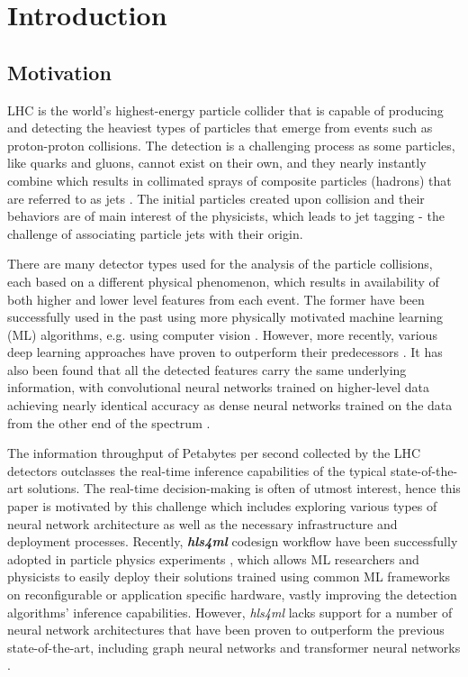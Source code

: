 \chapter{Introduction}\label{introduction}

\section{Motivation}\label{motivation}
LHC is the world's highest-energy particle collider that is capable of producing and detecting the heaviest types of particles that emerge from events such as proton-proton collisions. The detection is a challenging process as some particles, like quarks and gluons, cannot exist on their own, and they nearly instantly combine which results in collimated sprays of composite particles (hadrons) that are referred to as jets \cite{4-cernjets}. The initial particles created upon collision and their behaviors are of main interest of the physicists, which leads to jet tagging - the challenge of associating particle jets with their origin.

There are many detector types used for the analysis of the particle collisions, each based on a different physical phenomenon, which results in availability of both higher and lower level features from each event. The former have been successfully used in the past using more physically motivated machine learning (ML) algorithms, e.g. using computer vision \cite{5-cogan2015jet-images:}. However, more recently, various deep learning approaches have proven to outperform their predecessors \cite{6-de2016jet-images}. It has also been found that all the detected features carry the same underlying information, with convolutional neural networks trained on higher-level data achieving nearly identical accuracy as dense neural networks trained on the data from the other end of the spectrum \cite{7-moore2019reports}.

The information throughput of Petabytes per second collected by the LHC detectors outclasses the real-time inference capabilities of the typical state-of-the-art solutions. The real-time decision-making is often of utmost interest, hence this paper is motivated by this challenge which includes exploring various types of neural network architecture as well as the necessary infrastructure and deployment processes. Recently, \textit{\textbf{hls4ml}} codesign workflow have been successfully adopted in particle physics experiments \cite{8-fahim2021hls4ml:}, which allows ML researchers and physicists to easily deploy their solutions trained using common ML frameworks on reconfigurable or application specific hardware, vastly improving the detection algorithms' inference capabilities. However, \textit{hls4ml} lacks support for a number of neural network architectures that have been proven to outperform the previous state-of-the-art, including graph neural networks \cite{9-newman2019jedi-net:, 11-elabd2021graph} and transformer neural networks \cite{3-yuan2021constituentnet:}.


